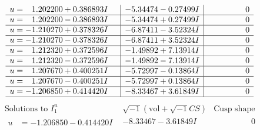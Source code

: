 \documentclass[1p]{elsarticle_modified}
\theoremstyle{definition}
\newcommand{\I}{\sqrt{-1}}
\begin{document}
$$\begin{array}{c|c|c}
\begin{aligned}
u &= \phantom{-}1.202200 + 0.386893 I\end{aligned}
 & -5.34474 - 0.27499 I & \phantom{-0.000000 } 0 \\ \hline\begin{aligned}
u &= \phantom{-}1.202200 - 0.386893 I\end{aligned}
 & -5.34474 + 0.27499 I & \phantom{-0.000000 } 0 \\ \hline\begin{aligned}
u &= -1.210270 + 0.378326 I\end{aligned}
 & -6.87411 - 3.52324 I & \phantom{-0.000000 } 0 \\ \hline\begin{aligned}
u &= -1.210270 - 0.378326 I\end{aligned}
 & -6.87411 + 3.52324 I & \phantom{-0.000000 } 0 \\ \hline\begin{aligned}
u &= \phantom{-}1.212320 + 0.372596 I\end{aligned}
 & -1.49892 + 7.13914 I & \phantom{-0.000000 } 0 \\ \hline\begin{aligned}
u &= \phantom{-}1.212320 - 0.372596 I\end{aligned}
 & -1.49892 - 7.13914 I & \phantom{-0.000000 } 0 \\ \hline\begin{aligned}
u &= \phantom{-}1.207670 + 0.400251 I\end{aligned}
 & -5.72997 - 0.13864 I & \phantom{-0.000000 } 0 \\ \hline\begin{aligned}
u &= \phantom{-}1.207670 - 0.400251 I\end{aligned}
 & -5.72997 + 0.13864 I & \phantom{-0.000000 } 0 \\ \hline\begin{aligned}
u &= -1.206850 + 0.414420 I\end{aligned}
 & -8.33467 + 3.61849 I & \phantom{-0.000000 } 0\\
 \hline 
 \end{array}$$\newpage$$\begin{array}{c|c|c}  
\text{Solutions to }I^u_{1}& \I (\text{vol} + \sqrt{-1}CS) & \text{Cusp shape}\\
 \hline 
\begin{aligned}
u &= -1.206850 - 0.414420 I\end{aligned}
 & -8.33467 - 3.61849 I & \phantom{-0.000000 } 0 \\ \hline\begin{aligned}

\end{aligned}
\end{array}$$
\end{document}
